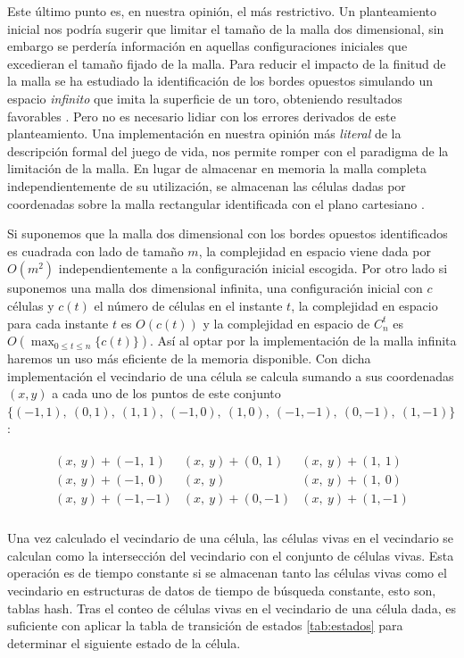 \documentclass[../proyecto.tex]{memoir}
\begin{document}
Este último punto es, en nuestra opinión, el más restrictivo. Un planteamiento inicial nos podría sugerir que limitar el tamaño de la malla dos dimensional, sin embargo se perdería información en aquellas configuraciones iniciales que excedieran el tamaño fijado de la malla. Para reducir el impacto de la finitud de la malla se ha estudiado la identificación de los bordes opuestos simulando un espacio \textit{infinito} que imita la superficie de un toro, obteniendo resultados favorables \cite{finitudMalla, finitudMalla2}. Pero no es necesario lidiar con los errores derivados de este planteamiento. Una implementación en nuestra opinión más \textit{literal} de la descripción formal del juego de vida, nos permite romper con el paradigma de la limitación de la malla. En lugar de almacenar en memoria la malla completa independientemente de su utilización, se almacenan las células dadas por coordenadas sobre la malla rectangular identificada con el plano cartesiano \cite{boardless}. 

Si suponemos que la malla dos dimensional con los bordes opuestos identificados es cuadrada con lado de tamaño $m$, la complejidad en espacio viene dada por $O(m^2)$ independientemente a la configuración inicial escogida. Por otro lado si suponemos una malla dos dimensional infinita, una configuración inicial con $c$ células y $c(t)$ el número de células en el instante $t$, la complejidad en espacio para cada instante $t$ es $O(c(t))$ y la complejidad en espacio de $C_n^t$ es $O(\max_{0\leq t\leq n}\{c(t)\})$. Así al optar por la implementación de la malla infinita haremos un uso más eficiente de la memoria disponible. Con dicha implementación el vecindario de una célula se calcula sumando a sus coordenadas $(x,y)$ a cada uno de los puntos de este conjunto $\{(-1, 1),\ (0, 1),\ (1, 1),\ (-1, 0),\ (1, 0),\ (-1,-1),\ (0,-1),\ (1,-1)\}$:

\begin{align*}
\begin{array}{lcr}
(x,\ y)+(-1,\ 1) & (x,\ y)+(0,\ 1) & (x,\ y)+(1,\ 1)\\
(x,\ y)+(-1,\ 0) & (x,\ y) & (x,\ y)+(1,\ 0)\\
(x,\ y)+(-1,-1) & (x,\ y)+(0,-1) & (x,\ y)+(1,-1)\\
\end{array} 
\end{align*}

Una vez calculado el vecindario de una célula, las células vivas en el vecindario se calculan como la intersección del vecindario con el conjunto de células vivas. Esta operación es de tiempo constante si se almacenan tanto las células vivas como el vecindario en estructuras de datos de tiempo de búsqueda constante, esto son, tablas hash. Tras el conteo de células vivas en el vecindario de una célula dada, es suficiente con aplicar la tabla de transición de estados \ref{tab:estados} para determinar el siguiente estado de la célula.
\end{document}
